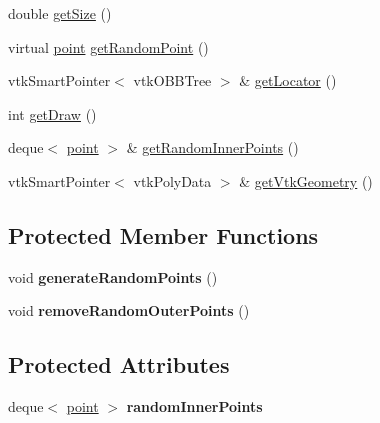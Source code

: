 \begin{DoxyCompactItemize}
double \hyperlink{class_simple_domain_a0a05345c81234a3e616447a16e9150c0}{get\+Size} ()
\item 
virtual \hyperlink{structpoint}{point} \hyperlink{class_simple_domain_afcf98b009584217d8ab03e0dbfa86839}{get\+Random\+Point} ()
\item 
vtk\+Smart\+Pointer$<$ vtk\+O\+B\+B\+Tree $>$ \& \hyperlink{class_simple_domain_a512393f4e387bd471bbe9241e6aa28a2}{get\+Locator} ()
\item 
int \hyperlink{class_simple_domain_a25b8e92e59ae6ec5b5a463caf4d19882}{get\+Draw} ()
\item 
deque$<$ \hyperlink{structpoint}{point} $>$ \& \hyperlink{class_simple_domain_acfe3e4aeaea246579b6102707d050bf0}{get\+Random\+Inner\+Points} ()
\item 
vtk\+Smart\+Pointer$<$ vtk\+Poly\+Data $>$ \& \hyperlink{class_simple_domain_a13f9ab047e641a022648ca6468651f9f}{get\+Vtk\+Geometry} ()
\end{DoxyCompactItemize}
\subsection*{Protected Member Functions}
\begin{DoxyCompactItemize}
\item 
void {\bfseries generate\+Random\+Points} ()\hypertarget{class_simple_domain_a47fede50eae6301d9aab0024d0cc32fa}{}\label{class_simple_domain_a47fede50eae6301d9aab0024d0cc32fa}

\item 
void {\bfseries remove\+Random\+Outer\+Points} ()\hypertarget{class_simple_domain_a2d3e15dd1f43edaffc0cc11376fd4d81}{}\label{class_simple_domain_a2d3e15dd1f43edaffc0cc11376fd4d81}

\end{DoxyCompactItemize}
\subsection*{Protected Attributes}
\begin{DoxyCompactItemize}
\item 
deque$<$ \hyperlink{structpoint}{point} $>$ {\bfseries random\+Inner\+Points}\hypertarget{class_simple_domain_a7b180aaf731d5809daf149025fb553d0}{}\label{class_simple_domain_a7b180aaf731d5809daf149025fb553d0}

\end{DoxyCompactItemize}
